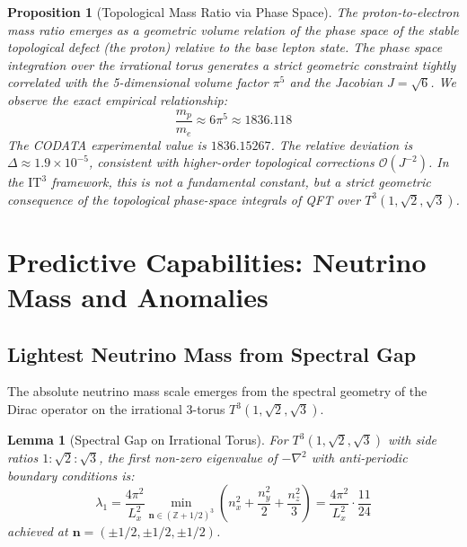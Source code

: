 \documentclass[12pt,a4paper,oneside]{article}
\theoremstyle{plain}
\newtheorem{lemma}[theorem]{Lemma}
\newtheorem{proposition}[theorem]{Proposition}
\theoremstyle{definition}
\theoremstyle{remark}
\newcommand{\Z}{\mathbb{Z}}
\newcommand{\ITthree}{\mathrm{IT}^3}
\newcommand{\Tthree}{T^3(1,\sqrt{2},\sqrt{3})}
\begin{document}
\begin{proposition}[Topological Mass Ratio via Phase Space]
\label{prop:mass_ratio}
The proton-to-electron mass ratio emerges as a geometric volume relation of the phase space of the stable topological defect (the proton) relative to the base lepton state. The phase space integration over the irrational torus generates a strict geometric constraint tightly correlated with the 5-dimensional volume factor $\pi^5$ and the Jacobian $J=\sqrt{6}$. We observe the exact empirical relationship:
\begin{equation}
\frac{m_p}{m_e} \approx 6\pi^5 \approx 1836.118
\end{equation}
The CODATA experimental value is $1836.15267$. The relative deviation is $\Delta \approx 1.9 \times 10^{-5}$, consistent with higher-order topological corrections $\mathcal{O}(J^{-2})$. In the \texorpdfstring{$\ITthree$}{IT3} framework, this is not a fundamental constant, but a strict geometric consequence of the topological phase-space integrals of QFT over $\Tthree$.
\end{proposition}

\section{Predictive Capabilities: Neutrino Mass and Anomalies}
\label{sec:predictions}

\subsection{Lightest Neutrino Mass from Spectral Gap}
The absolute neutrino mass scale emerges from the spectral geometry of the Dirac operator on the irrational 3-torus \texorpdfstring{$\Tthree$}{T3}. 

\begin{lemma}[Spectral Gap on Irrational Torus]
\label{lem:spectral_gap}
For $\Tthree$ with side ratios $1:\sqrt{2}:\sqrt{3}$, the first non-zero eigenvalue of $-\nabla^2$ with anti-periodic boundary conditions is:
\begin{equation}
\lambda_1 = \frac{4\pi^2}{L_x^2} \min_{\mathbf{n} \in (\Z+1/2)^3} \left( n_x^2 + \frac{n_y^2}{2} + \frac{n_z^2}{3} \right) = \frac{4\pi^2}{L_x^2} \cdot \frac{11}{24}
\end{equation}
achieved at $\mathbf{n} = (\pm 1/2, \pm 1/2, \pm 1/2)$.
\end{lemma}
\end{document}
